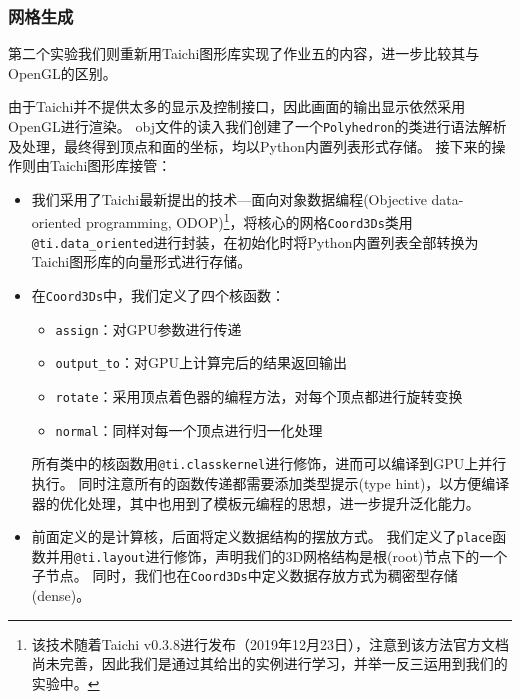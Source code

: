 \documentclass[thesis]{thesis}
\begin{document}
\subsubsection{网格生成}
第二个实验我们则重新用Taichi图形库实现了作业五的内容，进一步比较其与OpenGL的区别。

由于Taichi并不提供太多的显示及控制接口，因此画面的输出显示依然采用OpenGL进行渲染。
obj文件的读入我们创建了一个\verb'Polyhedron'的类进行语法解析及处理，最终得到顶点和面的坐标，均以Python内置列表形式存储。
接下来的操作则由Taichi图形库接管：
\begin{itemize}
    \item 我们采用了Taichi最新提出的技术---面向对象数据编程(Objective data-oriented programming, ODOP)\footnote{该技术随着Taichi v0.3.8进行发布（2019年12月23日），注意到该方法官方文档尚未完善，因此我们是通过其给出的实例进行学习，并举一反三运用到我们的实验中。}，将核心的网格\verb'Coord3Ds'类用\verb'@ti.data_oriented'进行封装，在初始化时将Python内置列表全部转换为Taichi图形库的向量形式进行存储。
    \item 在\verb'Coord3Ds'中，我们定义了四个核函数：
    \begin{itemize}
        \item \verb'assign'：对GPU参数进行传递
        \item \verb'output_to'：对GPU上计算完后的结果返回输出
        \item \verb'rotate'：采用顶点着色器的编程方法，对每个顶点都进行旋转变换
        \item \verb'normal'：同样对每一个顶点进行归一化处理
    \end{itemize}
    所有类中的核函数用\verb'@ti.classkernel'进行修饰，进而可以编译到GPU上并行执行。
    同时注意所有的函数传递都需要添加类型提示(type hint)，以方便编译器的优化处理，其中也用到了模板元编程的思想，进一步提升泛化能力。
    \item 前面定义的是计算核，后面将定义数据结构的摆放方式。
    我们定义了\verb'place'函数并用\verb'@ti.layout'进行修饰，声明我们的3D网格结构是根(root)节点下的一个子节点。
    同时，我们也在\verb'Coord3Ds'中定义数据存放方式为稠密型存储(dense)。
\end{itemize}
\end{document}

